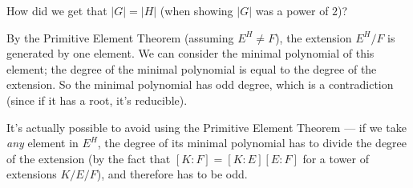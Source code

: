 \begin{question}
    How did we get that $\lvert G \rvert = \lvert H\rvert$ (when showing $\lvert G \rvert$ was a power of $2$)?
\end{question}

\begin{ans}
By the Primitive Element Theorem (assuming $E^H \neq F$), the extension $E^H/F$ is generated by one element. We can consider the minimal polynomial of this element; the degree of the minimal polynomial is equal to the degree of the extension. So the minimal polynomial has odd degree, which is a contradiction (since if it has a root, it's reducible). 

It's actually possible to avoid using the Primitive Element Theorem --- if we take \emph{any} element in $E^H$, the degree of its minimal polynomial has to divide the degree of the extension (by the fact that $[K : F] = [K : E][E : F]$ for a tower of extensions $K/E/F$), and therefore has to be odd. 
\end{ans}